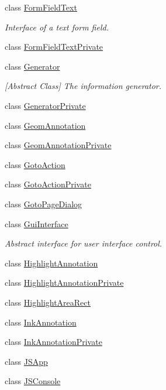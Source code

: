 \begin{DoxyCompactItemize}
class \hyperlink{classOkular_1_1FormFieldText}{Form\+Field\+Text}
\begin{DoxyCompactList}\small\item\em Interface of a text form field. \end{DoxyCompactList}\item 
class \hyperlink{classOkular_1_1FormFieldTextPrivate}{Form\+Field\+Text\+Private}
\item 
class \hyperlink{classOkular_1_1Generator}{Generator}
\begin{DoxyCompactList}\small\item\em \mbox{[}Abstract Class\mbox{]} The information generator. \end{DoxyCompactList}\item 
class \hyperlink{classOkular_1_1GeneratorPrivate}{Generator\+Private}
\item 
class \hyperlink{classOkular_1_1GeomAnnotation}{Geom\+Annotation}
\item 
class \hyperlink{classOkular_1_1GeomAnnotationPrivate}{Geom\+Annotation\+Private}
\item 
class \hyperlink{classOkular_1_1GotoAction}{Goto\+Action}
\item 
class \hyperlink{classOkular_1_1GotoActionPrivate}{Goto\+Action\+Private}
\item 
class \hyperlink{classOkular_1_1GotoPageDialog}{Goto\+Page\+Dialog}
\item 
class \hyperlink{classOkular_1_1GuiInterface}{Gui\+Interface}
\begin{DoxyCompactList}\small\item\em Abstract interface for user interface control. \end{DoxyCompactList}\item 
class \hyperlink{classOkular_1_1HighlightAnnotation}{Highlight\+Annotation}
\item 
class \hyperlink{classOkular_1_1HighlightAnnotationPrivate}{Highlight\+Annotation\+Private}
\item 
class \hyperlink{classOkular_1_1HighlightAreaRect}{Highlight\+Area\+Rect}
\item 
class \hyperlink{classOkular_1_1InkAnnotation}{Ink\+Annotation}
\item 
class \hyperlink{classOkular_1_1InkAnnotationPrivate}{Ink\+Annotation\+Private}
\item 
class \hyperlink{classOkular_1_1JSApp}{J\+S\+App}
\item 
class \hyperlink{classOkular_1_1JSConsole}{J\+S\+Console}

\end{DoxyCompactItemize}

